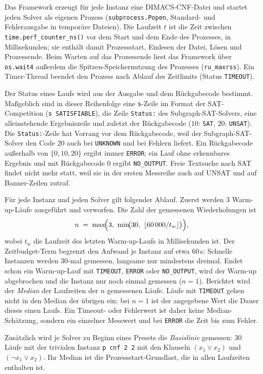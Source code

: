 \documentclass[a4paper,12pt]{article}
\theoremstyle{definition}
\begin{document}
Das Framework erzeugt für jede Instanz eine DIMACS-CNF-Datei und startet jeden Solver als eigenen Prozess (\texttt{subprocess.Popen}, Standard- und Fehlerausgabe in temporäre Dateien). Die Laufzeit $t$ ist die Zeit zwischen \texttt{time.perf\_counter\_ns()} vor dem Start und dem Ende des Prozesses, in Millisekunden; sie enthält damit Prozessstart, Einlesen der Datei, Lösen und Prozessende. Beim Warten auf das Prozessende liest das Framework über \texttt{os.wait4} außerdem die Spitzen-Speichernutzung des Prozesses (\texttt{ru\_maxrss}). Ein Timer-Thread beendet den Prozess nach Ablauf des Zeitlimits (Status \texttt{TIMEOUT}).

Der Status eines Laufs wird aus der Ausgabe und dem Rückgabecode bestimmt. Maßgeblich sind in dieser Reihenfolge eine \texttt{s}-Zeile im Format der SAT-Competition (\texttt{s SATISFIABLE}), die Zeile \texttt{Status:} des Subgraph-SAT-Solvers, eine alleinstehende Ergebniszeile und zuletzt der Rückgabecode ($10$: \texttt{SAT}, $20$: \texttt{UNSAT}). Die \texttt{Status:}-Zeile hat Vorrang vor dem Rückgabecode, weil der Subgraph-SAT-Solver den Code $20$ auch bei \texttt{UNKNOWN} und bei Fehlern liefert. Ein Rückgabecode außerhalb von $\{0, 10, 20\}$ ergibt immer \texttt{ERROR}; ein Lauf ohne erkennbares Ergebnis und mit Rückgabecode $0$ ergibt \texttt{NO\_OUTPUT}. Freie Textsuche nach \glqq SAT\grqq{} findet nicht mehr statt, weil sie in der ersten Messreihe auch auf \glqq UNSAT\grqq{} und auf Banner-Zeilen zutraf.

Für jede Instanz und jeden Solver gilt folgender Ablauf. Zuerst werden $3$ Warm-up-Läufe ausgeführt und verworfen. Die Zahl der gemessenen Wiederholungen ist
\[
 n \;=\; \max\!\Bigl(3,\ \min\!\bigl(30,\ \lfloor 60\,000 / t_w \rfloor\bigr)\Bigr),
\]
wobei $t_w$ die Laufzeit des letzten Warm-up-Laufs in Millisekunden ist. Der Zeitbudget-Term begrenzt den Aufwand je Instanz auf etwa $60$\,s: Schnelle Instanzen werden $30$-mal gemessen, langsame nur mindestens dreimal. Endet schon ein Warm-up-Lauf mit \texttt{TIMEOUT}, \texttt{ERROR} oder \texttt{NO\_OUTPUT}, wird der Warm-up abgebrochen und die Instanz nur noch einmal gemessen ($n=1$). Berichtet wird der \emph{Median} der Laufzeiten der $n$ gemessenen Läufe. Läufe mit \texttt{TIMEOUT} gehen nicht in den Median der übrigen ein; bei $n=1$ ist der angegebene Wert die Dauer dieses einen Laufs. Ein Timeout- oder Fehlerwert ist daher keine Median-Schätzung, sondern ein einzelner Messwert und bei \texttt{ERROR} die Zeit bis zum Fehler.

Zusätzlich wird je Solver zu Beginn eines Presets die \emph{Basislinie} gemessen: $30$ Läufe mit der trivialen Instanz \texttt{p cnf 2 2} mit den Klauseln $(x_1 \vee x_2)$ und $(\neg x_1 \vee x_2)$. Ihr Median ist die Prozessstart-Grundlast, die in allen Laufzeiten enthalten ist.
\end{document}
